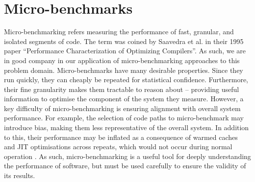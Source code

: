 \section{Micro-benchmarks}
\label{sec:ubenchmark}

Micro-benchmarking refers measuring the performance of fast, granular, and isolated segments of code.
The term was coined by Saavedra et al. in their 1995 paper \cite{saavedraPerformanceCharacterizationOptimizing1995} ``Performance Characterization of Optimizing Compilers''. As such, we are in good company in our application of micro-benchmarking approaches to this problem domain.
Micro-benchmarks have many desirable properties. Since they run quickly, they can cheaply be repeated for statistical confidence.
Furthermore, their fine granularity makes them tractable to reason about -- providing useful information to optimise the component of the system they measure.
However, a key difficulty of micro-benchmarking is ensuring alignment with overall system performance. For example, the selection of code paths to micro-benchmark may introduce bias, making them less representative of the overall system. In addition to this, their performance may be inflated as a consequence of warmed caches and JIT optimisations across repeats, which would not occur during normal operation \cite{barrettVirtualMachineWarmup2017}.
As such, micro-benchmarking is a useful tool for deeply understanding the performance of software, but must be used carefully to ensure the validity of its results.

